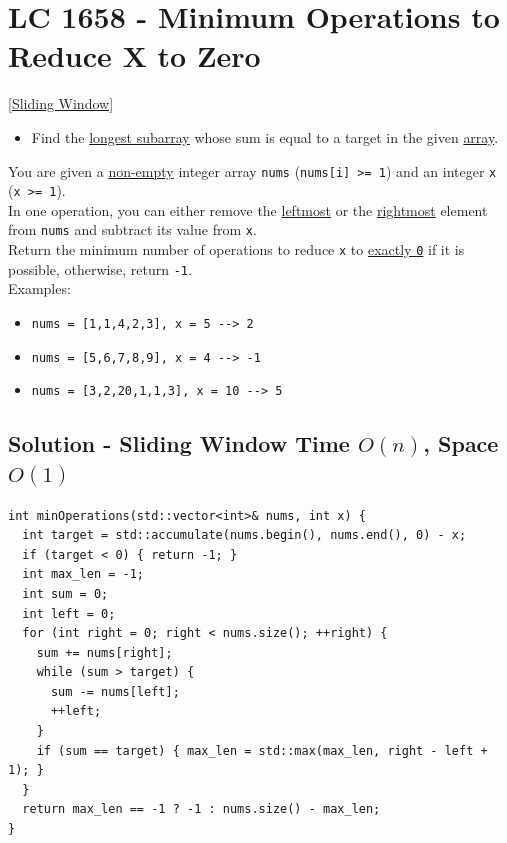 \section{LC 1658 - Minimum Operations to Reduce X to Zero}\label{lc1658}
{\hyperref[sec:sliding_window]{[Sliding Window]}}

\begin{tcolorbox}
\begin{itemize}
\item Find the \ul{longest subarray} whose sum is equal to a target in the given \ul{array}.
\end{itemize}
\end{tcolorbox}

You are given a \ul{non-empty} integer array {\colorbox{CodeBackground}{\lstinline|nums|}} ({\colorbox{CodeBackground}{\lstinline|nums[i] >= 1|}}) and an integer {\colorbox{CodeBackground}{\lstinline|x|}} ({\colorbox{CodeBackground}{\lstinline|x >= 1|}}). \\

In one operation, you can either remove the \ul{leftmost} or the \ul{rightmost} element from {\colorbox{CodeBackground}{\lstinline|nums|}} and subtract its value from {\colorbox{CodeBackground}{\lstinline|x|}}. \\

Return the minimum number of operations to reduce {\colorbox{CodeBackground}{\lstinline|x|}} to \ul{exactly {\colorbox{CodeBackground}{\lstinline|0|}}} if it is possible, otherwise, return {\colorbox{CodeBackground}{\lstinline|-1|}}.\\

Examples:
\begin{itemize}
\item {\colorbox{CodeBackground}{\lstinline|nums = [1,1,4,2,3], x = 5 --> 2|}}
\item {\colorbox{CodeBackground}{\lstinline|nums = [5,6,7,8,9], x = 4 --> -1|}}
\item {\colorbox{CodeBackground}{\lstinline|nums = [3,2,20,1,1,3], x = 10 --> 5|}}
\end{itemize}

\subsection*{Solution - Sliding Window {\scriptsize\color{gray}\Coffeecup\hspace{1mm}Time $O(n)$, Space $O(1)$}}
\begin{lstlisting}
int minOperations(std::vector<int>& nums, int x) {
  int target = std::accumulate(nums.begin(), nums.end(), 0) - x;
  if (target < 0) { return -1; }
  int max_len = -1;
  int sum = 0;
  int left = 0;
  for (int right = 0; right < nums.size(); ++right) {
    sum += nums[right];
    while (sum > target) {
      sum -= nums[left];
      ++left;
    }
    if (sum == target) { max_len = std::max(max_len, right - left + 1); }
  }
  return max_len == -1 ? -1 : nums.size() - max_len;
}
\end{lstlisting}

